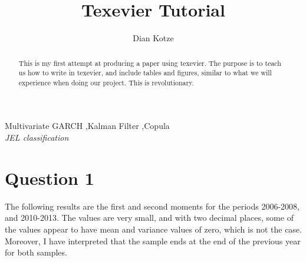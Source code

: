 \documentclass[11pt,preprint, authoryear]{elsarticle}
\numberwithin{equation}{section}
\numberwithin{figure}{section}
\numberwithin{table}{section}
\begin{document}
\begin{frontmatter}  %

\title{Texevier Tutorial}





\author[Add1]{Dian Kotze}





\address[Add1]{Stellenbosch University, Stellenbosch, South Africa}


\begin{abstract}
\small{
This is my first attempt at producing a paper using texevier. The
purpose is to teach us how to write in texevier, and include tables and
figures, similar to what we will experience when doing our project. This
is revolutionary.
}
\end{abstract}

\vspace{1cm}

\begin{keyword}
\footnotesize{
Multivariate GARCH \sep Kalman Filter \sep Copula \\ \vspace{0.3cm}
\textit{JEL classification} 
}
\end{keyword}
\vspace{0.5cm}
\end{frontmatter}



\pagestyle{fancy}
\chead{}
\lfoot{}
\lhead{}
\cfoot{}


\headsep 35pt %




\section{\texorpdfstring{Question 1
\label{Period 1 and 2 Moments}}{Question 1 }}\label{question-1}

The following results are the first and second moments for the periods
2006-2008, and 2010-2013. The values are very small, and with two
decimal places, some of the values appear to have mean and variance
values of zero, which is not the case. Moreover, I have interpreted that
the sample ends at the end of the previous year for both samples.
\end{document}
